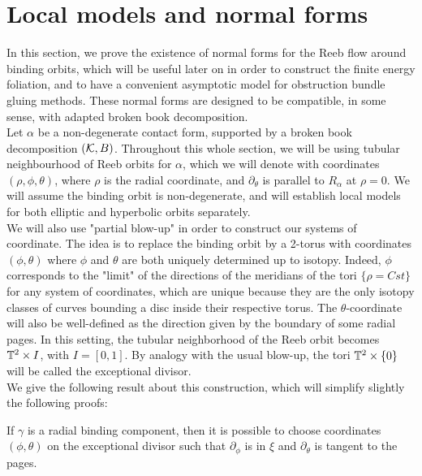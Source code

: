 \documentclass[../main.tex]{subfiles}
\begin{document}
\section{Local models and normal forms}\label{p:I}

In this section, we prove the existence of normal forms for the Reeb flow around binding orbits, which will be useful later on in order to construct the finite energy foliation, and to have a convenient asymptotic model for obstruction bundle gluing methods. These normal forms are designed to be compatible, in some sense, with adapted broken book decomposition. \\

Let $\alpha$ be a non-degenerate contact form, supported by a broken book decomposition $(\mathcal{K},B)$.
Throughout this whole section, we will be using tubular neighbourhood of Reeb orbits for $\alpha$,  which we will denote with coordinates $(\rho,\phi,\theta)$, where $\rho$ is the radial coordinate, and $\partial_\theta$ is parallel to $R_\alpha$ at $\rho = 0$. We will assume the binding orbit is non-degenerate, and will establish local models for both elliptic and hyperbolic orbits separately. \\

We will also use "partial blow-up" in order to construct our systems of coordinate. The idea is to replace the binding orbit by a 2-torus with coordinates $(\phi,\theta)$ where $\phi$ and $\theta$ are both uniquely determined up to isotopy. Indeed, $\phi$ corresponds to the "limit" of the directions of the meridians of the tori $\{\rho = Cst\}$ for any system of coordinates, which are unique because they are the only isotopy classes of curves bounding a disc inside their respective torus. The $\theta$-coordinate will also be well-defined as the direction given by the boundary of some radial pages. In this setting, the tubular neighborhood of the Reeb orbit becomes $\mathbb{T}^2\times I$, with $I = [0,1]$. By analogy with the usual blow-up, the tori $\mathbb{T}^2\times \{0\}$ will be called the exceptional divisor.\\

We give the following result about this construction, which will simplify slightly the following proofs:

\begin{lemma}\label{l:blowup}
If $\gamma$ is a radial binding component, then it is possible to choose coordinates $(\phi,\theta)$ on the exceptional divisor such that $\partial_\phi$ is in $\xi$ and $\partial_\theta$ is tangent to the pages.
\end{lemma}
\end{document}
